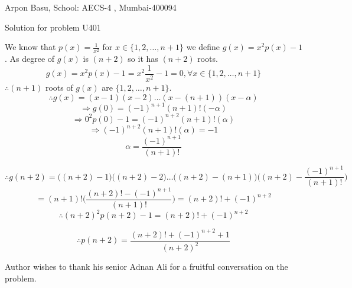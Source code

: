 \documentclass[10pt,a4paper]{extarticle}
\begin{document}
\begin{center}


Arpon Basu, School: AECS-4 , Mumbai-400094

Solution for problem U401
\end{center}

We know that $p(x)=\frac{1}{x^2}$ for $x \in \{1,2,\dots , n+1\}$
we define $g(x)=x^2p(x)-1$. As degree of $g(x)$ is $(n+2)$ so it has $(n+2)$ roots.\\
$$g(x)=x^2p(x)-1= x^2\frac{1}{x^2} -1 =0 , \forall x\in \{1,2,\dots , n+1\}$$ 
$\therefore (n+1) $ roots of $g(x)$ are $ \{1,2,\dots , n+1\} $.
$$\therefore g(x)=(x-1)(x-2) \dots (x-(n+1))(x-\alpha) $$
$$\Rightarrow g(0)=(-1)^{n+1}(n+1)!(-\alpha) $$
$$\Rightarrow 0^2p(0)-1 =(-1)^{n+2}(n+1)!(\alpha) $$
$$\Rightarrow (-1)^{n+2}(n+1)!(\alpha)=-1 $$
$$ \alpha =\frac{(-1)^{n+1}}{(n+1)!} $$

$$ \therefore g(n+2)=\big((n+2)-1\big)\big((n+2)-2\big) \dots \big((n+2)-(n+1)\big)\Big((n+2)-\frac{(-1)^{n+1}}{(n+1)!}\Big) $$
$$ =(n+1)! \big (\frac{(n+2)!-(-1)^{n+1}}{(n+1)!} \big ) = (n+2)! + (-1)^{n+2} $$
$$ \therefore (n+2)^2 p(n+2) -1 =(n+2)! + (-1)^{n+2}  $$ 

$$ \therefore p(n+2)=\dfrac{(n+2)! + (-1)^{n+2}+1}{(n+2)^2}$$

Author wishes to thank his senior Adnan Ali for a fruitful conversation on the problem.
\end{document}
